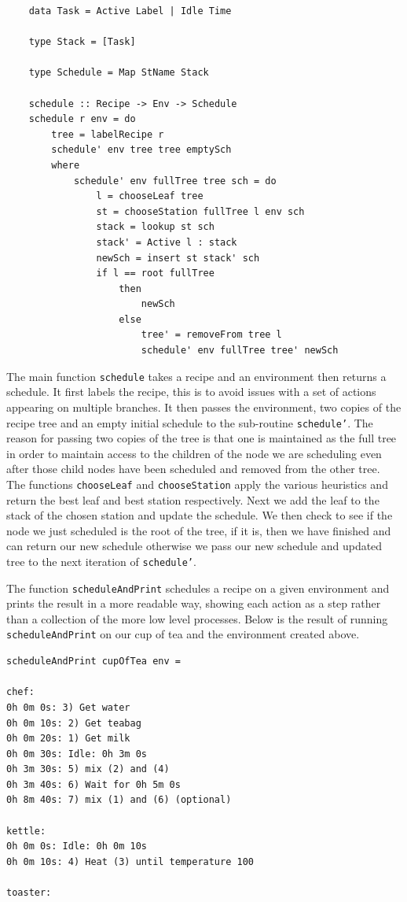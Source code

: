 \documentclass[11pt]{article}
\begin{document}
\begin{lstlisting}
    data Task = Active Label | Idle Time

    type Stack = [Task]

    type Schedule = Map StName Stack

    schedule :: Recipe -> Env -> Schedule
    schedule r env = do
        tree = labelRecipe r
        schedule' env tree tree emptySch
        where
            schedule' env fullTree tree sch = do
                l = chooseLeaf tree
                st = chooseStation fullTree l env sch
                stack = lookup st sch
                stack' = Active l : stack
                newSch = insert st stack' sch
                if l == root fullTree
                    then
                        newSch
                    else
                        tree' = removeFrom tree l
                        schedule' env fullTree tree' newSch
\end{lstlisting}

The main function \texttt{schedule} takes a recipe and an environment then returns a schedule.
It first labels the recipe, this is to avoid issues with a set of actions appearing on multiple
branches. It then passes the environment, two copies of the recipe tree and an empty initial
schedule to the sub-routine \texttt{schedule'}. The reason for passing two copies of the tree
is that one is maintained as the full tree in order to maintain access to the children of the
node we are scheduling even after those child nodes have been scheduled and removed from the other
tree. The functions \texttt{chooseLeaf} and \texttt{chooseStation} apply the various heuristics
and return the best leaf and best station respectively. Next we add the leaf to the stack of
the chosen station and update the schedule. We then check to see if the node we just
scheduled is the root of the tree, if it is, then we have finished and can return our new schedule
otherwise we pass our new schedule and updated tree to the next iteration of \texttt{schedule'}.

\medbreak

The function \texttt{scheduleAndPrint} schedules a recipe on a given environment
and prints the result in a more readable way, showing each action as a step rather
than a collection of the more low level processes. Below is the result of running
\texttt{scheduleAndPrint} on our cup of tea and the environment created above.

\begin{lstlisting}
scheduleAndPrint cupOfTea env = 

chef:
0h 0m 0s: 3) Get water
0h 0m 10s: 2) Get teabag
0h 0m 20s: 1) Get milk
0h 0m 30s: Idle: 0h 3m 0s
0h 3m 30s: 5) mix (2) and (4)
0h 3m 40s: 6) Wait for 0h 5m 0s
0h 8m 40s: 7) mix (1) and (6) (optional)

kettle:
0h 0m 0s: Idle: 0h 0m 10s
0h 0m 10s: 4) Heat (3) until temperature 100

toaster:
\end{lstlisting}
\end{document}
